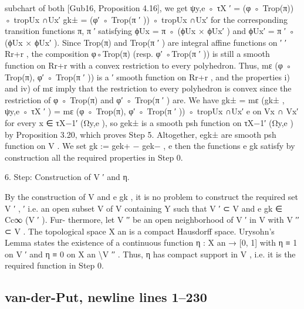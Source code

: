 \documentclass[
  10pt,
]{article}
\newenvironment{Shaded}{}{}
\newcommand{\NormalTok}[1]{#1}
\begin{document}
\begin{Shaded}
\begin{Highlighting}[]
\NormalTok{subchart of both [Gub16, Proposition 4.16], we get}
\NormalTok{                           ψy,e ◦ τX ′ = (φ ◦ Trop(π)) ◦ tropUx ∩Ux′}
\NormalTok{                                  gk± = (φ′ ◦ Trop(π ′ )) ◦ tropUx ∩Ux′}
\NormalTok{for the corresponding transition functions π, π ′ satisfying ϕUx = π ◦ (ϕUx × ϕUx′ ) and}
\NormalTok{ϕUx′ = π ′ ◦ (ϕUx × ϕUx′ ). Since Trop(π) and Trop(π ′ ) are integral affine functions on}
\NormalTok{     ′                                                                                     ′}
\NormalTok{Rr+r , the composition φ◦Trop(π) (resp. φ′ ◦Trop(π ′ )) is still a smooth function on Rr+r}
\NormalTok{with a convex restriction to every polyhedron. Thus, mε (φ ◦ Trop(π), φ′ ◦ Trop(π ′ )) is a}
\NormalTok{                           ′}
\NormalTok{smooth function on Rr+r , and the properties i) and iv) of mε imply that the restriction}
\NormalTok{to every polyhedron is convex since the restriction of φ ◦ Trop(π) and φ′ ◦ Trop(π ′ ) are.}
\NormalTok{We have}
\NormalTok{          gk± = mε (gk± , ψy,e ◦ τX ′ ) = mε (φ ◦ Trop(π), φ′ ◦ Trop(π ′ )) ◦ tropUx ∩Ux′}
\NormalTok{          e}
\NormalTok{on Vx ∩ Vx′ for every x ∈ τX−1′ (Ωy,e ), so gek± is a smooth psh function on τX−1′ (Ωy,e ) by}
\NormalTok{Proposition 3.20, which proves Step 5.}
\NormalTok{  Altogether, egk± are smooth psh function on V . We set}
\NormalTok{                                         gk := gek+ − gek− ,}
\NormalTok{                                         e}
\NormalTok{then the functions e}
\NormalTok{                   gk satisfy by construction all the required properties in Step 0.}

\NormalTok{     6. Step: Construction of V ′ and η.}

\NormalTok{   By the construction of V and e  gk , it is no problem to construct the required set V ′ ,}
\NormalTok{                       ′}
\NormalTok{i.e. an open subset V of V containing Y such that V ′ ⊂ V and e        gk ∈ Cc∞ (V ′ ). Fur{-}}
\NormalTok{thermore, let V ′′ be an open neighborhood of V ′ in V with V ′′ ⊂ V . The topological}
\NormalTok{space X an is a compact Hausdorff space. Urysohn’s Lemma states the existence of a}
\NormalTok{continuous function η : X an → [0, 1] with η ≡ 1 on V ′ and η ≡ 0 on X an \textbackslash{}V ′′ . Thus, η}
\NormalTok{has compact support in V , i.e. it is the required function in Step 0.}
\end{Highlighting}
\end{Shaded}

\subsection{van-der-Put, newline lines
1--230}\label{van-der-put-newline-lines-1230}
\end{document}
